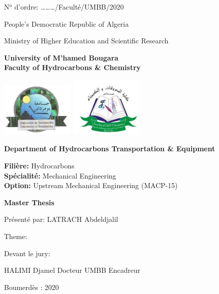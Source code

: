 {\small N$^o$ d'ordre: \ldots\ldots\ldots/Faculté/UMBB/2020}
\begin{center}
	{\large People's Democratic Republic of Algeria}

	{\large Ministry of Higher Education and Scientific Research}

	\vspace{.6cm}
\textbf{University of M'hamed Bougara}\\ 
\textbf{Faculty of Hydrocarbons \& Chemistry} 

\includegraphics[width=3.5cm]{misc/logos/umbb}\hfill
\includegraphics[width=3.5cm]{misc/logos/fhc}

\textbf{Department of Hydrocarbons Transportation \& Equipment} 
\end{center}

\vspace{1cm}

\textbf{Filière:} Hydrocarbons\\
\textbf{Spécialité:} Mechanical Engineering\\
\textbf{Option:} Upstream Mechanical Engineering (MACP-15) 

\vspace{1cm}

\begin{center}
	\textbf{Master Thesis} 

	Présenté par: LATRACH Abdeldjalil

	\vspace{.5cm}

	Theme:

	\vspace{.5cm}

\end{center}

Devant le jury:

HALIMI Djamel\hspace{2cm} Docteur\hspace{2cm} UMBB\hspace{2cm} Encadreur

\vfill

\begin{center}
	Boumerdès : 2020
\end{center}
